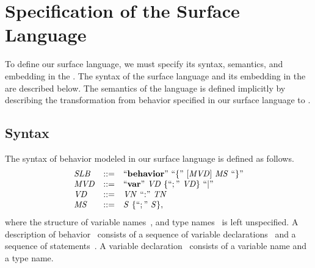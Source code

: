 \section{Specification of the Surface Language}
\label{sec:grammars-and-metamodels:SL-specification}

To define our surface language, we must specify its syntax, semantics, and embedding in the \UML.
The syntax of the surface language and its embedding in the \UML are described below.
The semantics of the language is defined implicitly by describing the transformation from behavior specified in our surface language to \Activities.


\subsection{Syntax}
\label{sub:grammars-and-metamodels:Syntax-SL}

The syntax of behavior modeled in our surface language is defined as follows.
\[
\begin{array}{lcl}
\nonterminal{SLB} & ::= & \terminal{behavior}~\terminalsymbol{\{}~[\nonterminal{MVD}]~\nonterminal{MS}~\terminalsymbol{\}}\\
\nonterminal{MVD} & ::= & \terminal{var}~\nonterminal{VD}~\{\terminalsymbol{;}~\nonterminal{VD}\}~\terminalsymbol{|}\\
\nonterminal{VD} & ::= & \nonterminal{VN}~\terminalsymbol{\mathalpha{:}}~\nonterminal{TN}\\
\nonterminal{MS} & ::= & \nonterminal{S}~\{\terminalsymbol{;}~\nonterminal{S}\},
\end{array}
\]
where the structure of variable names~, and type names~ is left unspecified.
A description of behavior~ consists of a sequence of variable declarations~ and a sequence of statements~.
A variable declaration~ consists of a variable name and a type name.

